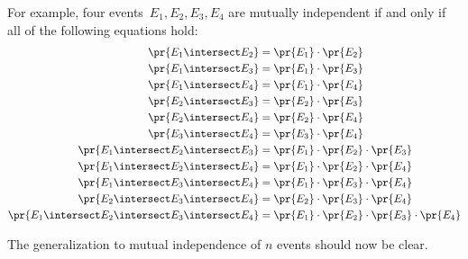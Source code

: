 For example, four events~$E_1, E_2, E_3, E_4$ are mutually
independent if and only if all of the following equations hold:
%
\begin{align*}
\pr{E_1 \intersect E_2}
    & = \pr{E_1} \cdot \pr{E_2}
\\
\pr{E_1 \intersect E_3}
    & = \pr{E_1} \cdot \pr{E_3}
\\
\pr{E_1 \intersect E_4}
    & = \pr{E_1} \cdot \pr{E_4}
\\
\pr{E_2 \intersect E_3}
    & = \pr{E_2} \cdot \pr{E_3}
\\
\pr{E_2 \intersect E_4}
    & = \pr{E_2} \cdot \pr{E_4}
\\
\pr{E_3 \intersect E_4}
    & = \pr{E_3} \cdot \pr{E_4}
 \\
\pr{E_1 \intersect E_2 \intersect E_3}
    & = \pr{E_1} \cdot \pr{E_2} \cdot \pr{E_3}
\\
\pr{E_1 \intersect E_2 \intersect E_4}
    & = \pr{E_1} \cdot \pr{E_2} \cdot \pr{E_4}
\\
\pr{E_1 \intersect E_3 \intersect E_4}
    & = \pr{E_1} \cdot \pr{E_3} \cdot \pr{E_4}
\\
\pr{E_2 \intersect E_3 \intersect E_4}
    & = \pr{E_2} \cdot \pr{E_3} \cdot \pr{E_4}
 \\
\pr{E_1 \intersect E_2 \intersect E_3 \intersect E_4} & = \pr{E_1} \cdot \pr{E_2} \cdot \pr{E_3} \cdot \pr{E_4}
\end{align*}

The generalization to mutual independence of $n$ events should now be clear.

